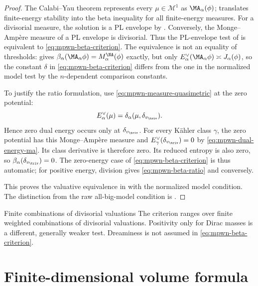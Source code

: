 \begin{proof}
The Calabi--Yau theorem represents every $\mu\in\mathcal M^1$ as
$\MA_\alpha(\phi)$;  translates
finite-energy stability into the beta inequality for all finite-energy
measures.  For a divisorial measure, the solution is a PL envelope by
.  Conversely, the
Monge--Amp\`ere measure of a PL envelope is divisorial.  Thus the PL-envelope
test of  is equivalent to
\eqref{eq:mpwn-beta-criterion}.  The equivalence is not an equality of
thresholds:  gives
$\beta_\alpha(\MA_\alpha\phi)=M^{\NA}_\alpha(\phi)$ exactly, but only
$E^\vee_\alpha(\MA_\alpha\phi)\asymp J_\alpha(\phi)$, so the constant
$\delta$ in \eqref{eq:mpwn-beta-criterion} differs from the one in the
normalized model test by the $n$-dependent comparison constants.

To justify the ratio formulation, use
\eqref{eq:mpwn-measure-quasimetric} at the zero potential:
\[
 E_\alpha^\vee(\mu)
       =\delta_\alpha(\mu,\delta_{v_{\triv}}).
\]
Hence zero dual energy occurs only at $\delta_{v_{\triv}}$.
For every K\"ahler class $\gamma$, the zero potential has this
Monge--Amp\`ere measure and
$E_\gamma^\vee(\delta_{v_{\triv}})=0$ by
\eqref{eq:mpwn-dual-energy-ma}.  Its class derivative is therefore
zero.  Its reduced entropy is also zero, so
$\beta_\alpha(\delta_{v_{\triv}})=0$.
The zero-energy case of \eqref{eq:mpwn-beta-criterion} is thus
automatic; for positive energy, division gives
\eqref{eq:mpwn-beta-ratio} and conversely.

This proves the valuative equivalence in
\cite[Theorem~10.0.4]{MPWN25} with the normalized model condition.
The distinction from the raw all-big-model condition is
.
\end{proof}

\noindent\begin{minipage}{\linewidth}
\begin{warning}{Finite combinations of divisorial valuations}
\label{warn:mpwn-k-combination-tests}
The criterion ranges over finite weighted combinations of divisorial
valuations.  Positivity only for Dirac masses is a different, generally
weaker test.  Dreaminess is not assumed in
\eqref{eq:mpwn-beta-criterion}.
\end{warning}
\end{minipage}\par

\section{Finite-dimensional volume formula}
\label{sec:mpwn-k-volume}

